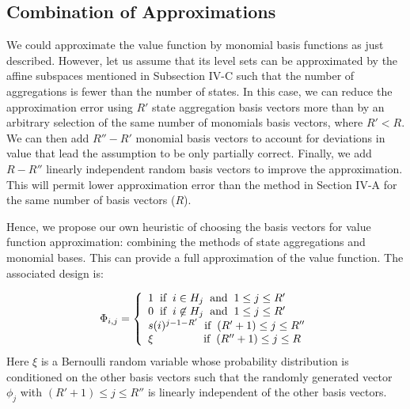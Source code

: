 \documentclass[conference]{IEEEtran}
\begin{document}
\subsection{Combination of Approximations}
    
    We could approximate the value function by monomial basis functions as just described. However, let us assume that its level sets can be approximated by the affine subspaces mentioned in Subsection IV-C such that the number of aggregations is fewer than the number of states. In this case, we can reduce the approximation error using $R'$ state aggregation basis vectors more than by an arbitrary selection of the same number of monomials basis vectors, where $R'<R$. We can then add $R''-R'$ monomial basis vectors to account for deviations in value that lead the assumption to be only partially correct. Finally, we add $R-R''$ linearly independent random basis vectors to improve the approximation. This will permit lower approximation error than the method in Section IV-A for the same number of basis vectors ($R$).
    
    
    Hence, we propose our own heuristic of choosing the basis vectors for value function approximation: combining the methods of state aggregations and monomial bases. This can provide a full approximation of the value function. The associated design is:
    
    \begin{displaymath}
        \Phi_{i,j}=\left\{
            \begin{array}{l}
            1 \hspace{0.2cm} \text{if} \hspace{0.2cm} i\in H_{j} \hspace{0.2cm} \text{and} \hspace{0.2cm} 1\leq j\leq R'\\
            0 \hspace{0.2cm} \text{if} \hspace{0.2cm} i\not\in H_{j} \hspace{0.2cm} \text{and} \hspace{0.2cm} 1\leq j\leq R'\\
            s(i)^{j-1-R'} \hspace{0.2cm} \text{if} \hspace{0.2cm} (R'+1)\leq j\leq R''\\
            \xi \hspace{1.6cm} \text{if} \hspace{0.2cm} (R''+1)\leq j\leq R
            \end{array}
            \right.
    \end{displaymath} Here $\xi$ is a Bernoulli random variable whose probability distribution is conditioned on the other basis vectors such that the randomly generated vector $\phi_{j}$ with $(R'+1)\leq j\leq R''$ is linearly independent of the other basis vectors.
    
\end{document}
